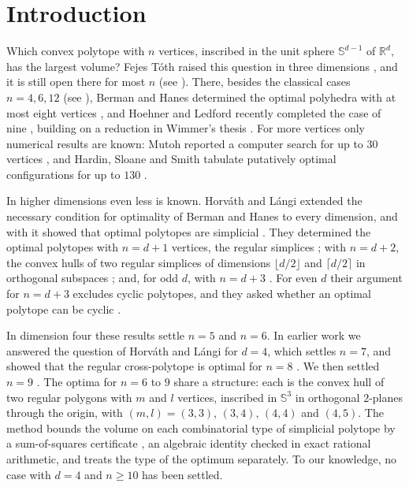 \section{Introduction}
\label{sec:intro}

Which convex polytope with $n$ vertices, inscribed in the unit sphere
$\mathbb{S}^{d-1}$ of $\mathbb{R}^{d}$, has the largest volume? Fejes T\'{o}th
raised this question in three dimensions \cite{fejes-toth-1964}, and it is
still open there for most $n$ (see \cite[Section~1]{horvath-langi-2016}).
There, besides the classical cases $n = 4, 6,
12$ (see \cite[Section~1.1]{hoehner-ledford-2026}), Berman and Hanes
determined the optimal polyhedra with at most eight vertices
\cite{berman-hanes-1970}, and Hoehner and Ledford recently completed the case
of nine \cite{hoehner-ledford-2026}, building on a reduction in Wimmer's
thesis \cite{wimmer-1998}. For more vertices only numerical results are
known: Mutoh reported a computer search for up to $30$ vertices
\cite{mutoh-2003}, and Hardin, Sloane and Smith tabulate putatively optimal
configurations for up to $130$ \cite{hardin-sloane-smith}.

In higher dimensions even less is known. Horv\'{a}th and L\'{a}ngi extended
the necessary condition for optimality of Berman and Hanes to every dimension,
and with it showed that optimal polytopes are simplicial
\cite[Lemma~1]{horvath-langi-2016}. They determined the optimal polytopes with
$n = d + 1$ vertices, the regular simplices
\cite[Corollary~1]{horvath-langi-2016}; with $n = d + 2$, the convex
hulls of two regular simplices of dimensions $\lfloor d/2\rfloor$ and
$\lceil d/2\rceil$ in orthogonal subspaces
\cite[Theorem~2]{horvath-langi-2016}; and, for odd $d$, with $n = d + 3$
\cite[Theorem~3]{horvath-langi-2016}. For even $d$ their argument for
$n = d + 3$ excludes cyclic polytopes, and they asked whether an optimal
polytope can be cyclic \cite[Problem~2]{horvath-langi-2016}.

In dimension four these results settle $n = 5$ and $n = 6$. In earlier work
we answered the question of Horv\'{a}th and L\'{a}ngi for $d = 4$, which
settles $n = 7$, and showed that the regular cross-polytope is optimal for
$n = 8$ \cite{medgyes-maxvol-d4}. We then settled $n = 9$
\cite{medgyes-maxvol-d4-n9}. The optima for $n = 6$ to $9$ share a structure:
each is the convex hull of two regular polygons with $m$ and $l$ vertices,
inscribed in $\mathbb{S}^{3}$ in orthogonal $2$-planes through the origin,
with $(m, l) = (3, 3)$, $(3, 4)$, $(4, 4)$ and $(4, 5)$. The method bounds
the volume on each combinatorial type of simplicial polytope by a
sum-of-squares certificate \cite{parrilo-2003}, an algebraic identity checked
in exact rational arithmetic, and treats the type of the optimum separately.
To our knowledge, no case with $d = 4$ and $n \geq 10$ has been settled.

